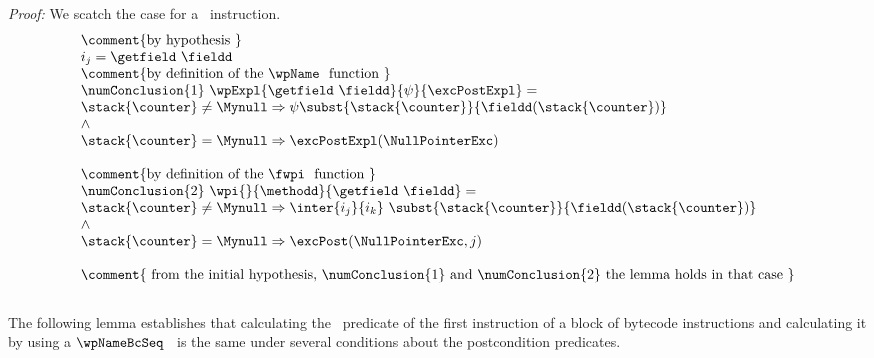 \textit{Proof:}
We scatch the case for a \getfield \  instruction.
$$
\begin{array}{l}
  \mbox{\rm\comment{by hypothesis }} \\
    i_j = \getfield \ \fieldd \\
   \mbox{\rm\comment{by definition of the \wpName \  function }} \\
    \numConclusion{1} \  \wpExpl{\getfield \ \fieldd }{\psi}{\excPostExpl} = \\
    
        \stack{\counter } \neq \Mynull \Rightarrow 
			                \psi   \subst{ \stack{\counter} }{ \fieldd(\stack{\counter})}\\          
			  \wedge \\
			  \stack{\counter }  = \Mynull  \Rightarrow   \excPostExpl( \NullPointerExc ) \\\\


  \mbox{\rm\comment{by definition of the \fwpi \  function }} \\
\numConclusion{2} \  \wpi{}{\methodd}{ \getfield \ \fieldd} = \\
                           \stack{\counter } \neq \Mynull \Rightarrow 
			         \inter{i_j}{i_k}   \  \subst{ \stack{\counter} }{ \fieldd(\stack{\counter})}\\          
			  \wedge \\
			  \stack{\counter }  = \Mynull  \Rightarrow   \excPost( \NullPointerExc,j ) \\\\

  \mbox{\rm\comment{ from the initial hypothesis, \numConclusion{1}  and \numConclusion{2} the lemma holds in that case   }}
    

\end{array}
$$
\Qed\\

The following lemma establishes 
that calculating the \fwpi \ predicate of the first instruction of a block of bytecode 
instructions and calculating it by using a $\wpNameBcSeq$ \ is the same under several conditions about the postcondition predicates.



